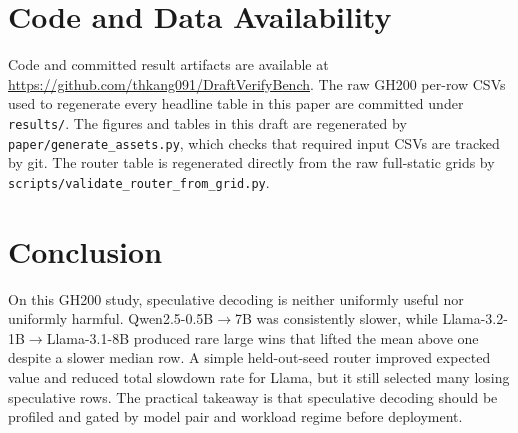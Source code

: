 \documentclass{article}
\begin{document}
\section{Code and Data Availability}

Code and committed result artifacts are available at \url{https://github.com/thkang091/DraftVerifyBench}.
The raw GH200 per-row CSVs used to regenerate every headline table in this paper are committed under \texttt{results/}.
The figures and tables in this draft are regenerated by \texttt{paper/generate\_assets.py}, which checks that required input CSVs are tracked by git.
The router table is regenerated directly from the raw full-static grids by \texttt{scripts/validate\_router\_from\_grid.py}.

\section{Conclusion}

On this GH200 study, speculative decoding is neither uniformly useful nor uniformly harmful.
Qwen2.5-0.5B$\rightarrow$7B was consistently slower, while Llama-3.2-1B$\rightarrow$Llama-3.1-8B produced rare large wins that lifted the mean above one despite a slower median row.
A simple held-out-seed router improved expected value and reduced total slowdown rate for Llama, but it still selected many losing speculative rows.
The practical takeaway is that speculative decoding should be profiled and gated by model pair and workload regime before deployment.



\end{document}
